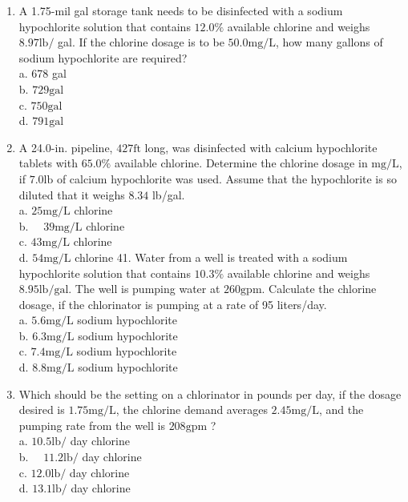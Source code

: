 \documentclass[10pt]{article}
\begin{document}
\begin{enumerate}
  \item A 1.75-mil gal storage tank needs to be disinfected with a sodium hypochlorite solution that contains $12.0 \%$ available chlorine and weighs $8.97 \mathrm{lb} /$ gal. If the chlorine dosage is to be $50.0 \mathrm{mg} / \mathrm{L}$, how many gallons of sodium hypochlorite are required?\\
a. 678 gal\\
b. $729 \mathrm{gal}$\\
c. $750 \mathrm{gal}$\\
d. $791 \mathrm{gal}$

  \item A 24.0-in. pipeline, $427 \mathrm{ft}$ long, was disinfected with calcium hypochlorite tablets with $65.0 \%$ available chlorine. Determine the chlorine dosage in $\mathrm{mg} / \mathrm{L}$, if $7.0 \mathrm{lb}$ of calcium hypochlorite was used. Assume that the hypochlorite is so diluted that it weighs $8.34$ lb/gal.\\
a. $25 \mathrm{mg} / \mathrm{L}$ chlorine\\
b. $\quad 39 \mathrm{mg} / \mathrm{L}$ chlorine\\
c. $43 \mathrm{mg} / \mathrm{L}$ chlorine\\
d. $54 \mathrm{mg} / \mathrm{L}$ chlorine 41. Water from a well is treated with a sodium hypochlorite solution that contains $10.3 \%$ available chlorine and weighs $8.95 \mathrm{lb} / \mathrm{gal}$. The well is pumping water at $260 \mathrm{gpm}$. Calculate the chlorine dosage, if the chlorinator is pumping at a rate of 95 liters/day.\\
a. $5.6 \mathrm{mg} / \mathrm{L}$ sodium hypochlorite\\
b. $6.3 \mathrm{mg} / \mathrm{L}$ sodium hypochlorite\\
c. $7.4 \mathrm{mg} / \mathrm{L}$ sodium hypochlorite\\
d. $8.8 \mathrm{mg} / \mathrm{L}$ sodium hypochlorite

  \item Which should be the setting on a chlorinator in pounds per day, if the dosage desired is $1.75 \mathrm{mg} / \mathrm{L}$, the chlorine demand averages $2.45 \mathrm{mg} / \mathrm{L}$, and the pumping rate from the well is $208 \mathrm{gpm}$ ?\\
a. $10.5 \mathrm{lb} /$ day chlorine\\
b. $\quad 11.2 \mathrm{lb} /$ day chlorine\\
c. $12.0 \mathrm{lb} /$ day chlorine\\
d. $13.1 \mathrm{lb} /$ day chlorine


\end{enumerate}
\end{document}
